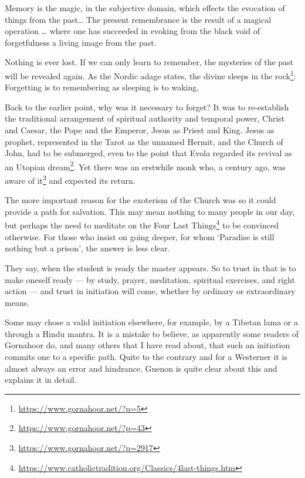 \begin{quotex}
Memory is the magic, in the subjective domain, which effects the evocation of things from the past… The present remembrance is the result of a magical operation … where one has succeeded in evoking from the black void of forgetfulness a living image from the past. 

\end{quotex}
Nothing is ever lost. If we can only learn to remember, the mysteries of the past will be revealed again. As the Nordic adage states, the divine sleeps in the rock\footnote{\url{https://www.gornahoor.net/?p=5}}: Forgetting is to remembering as sleeping is to waking.

Back to the earlier point, why was it necessary to forget? It was to re-establish the traditional arrangement of spiritual authority and temporal power, Christ and Caesar, the Pope and the Emperor, Jesus as Priest and King. Jesus as prophet, represented in the Tarot as the unnamed Hermit, and the Church of John, had to be submerged, even to the point that Evola regarded its revival as an Utopian dream\footnote{\url{https://www.gornahoor.net/?p=43}}. Yet there was an erstwhile monk who, a century ago, was aware of it\footnote{\url{https://www.gornahoor.net/?p=2917}} and expected its return.

The more important reason for the exoterism of the Church was so it could provide a path for salvation. This may mean nothing to many people in our day, but perhaps the need to meditate on the Four Last Things\footnote{\url{https://www.catholictradition.org/Classics/4last-things.htm}} to be convinced otherwise. For those who insist on going deeper, for whom `Paradise is still nothing but a prison’, the answer is less clear.

They say, when the student is ready the master appears. So to trust in that is to make oneself ready — by study, prayer, meditation, spiritual exercises, and right action — and trust in initiation will come, whether by ordinary or extraordinary means.

Some may chose a valid initiation elsewhere, for example, by a Tibetan lama or a through a Hindu mantra. It is a mistake to believe, as apparently some readers of Gornahoor do, and many others that I have read about, that such an initiation commits one to a specific path. Quite to the contrary and for a Westerner it is almost always an error and hindrance. Guenon is quite clear about this and explains it in detail.


